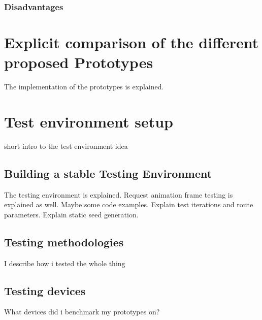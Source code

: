 \subsubsection{Disadvantages}



\section{Explicit comparison of the different proposed Prototypes}

The implementation of the prototypes is explained.


\section{Test environment setup}

short intro to the test environment idea

\subsection{Building a stable Testing Environment}

The testing environment is explained. Request animation frame testing is explained as well. Maybe some code examples. Explain test iterations and route parameters. Explain static seed generation.

\subsection{Testing methodologies}

I describe how i tested the whole thing

\subsection{Testing devices}

What devices did i benchmark my prototypes on?

